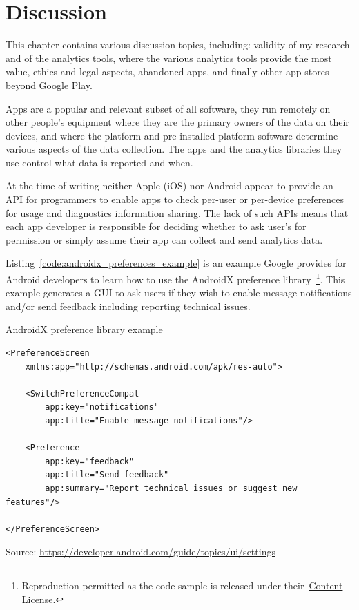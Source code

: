 \chapter{Discussion}
\label{chapter-discussion}

This chapter contains various discussion topics, including: validity of my research and of the analytics tools, where the various analytics tools provide the most value, ethics and legal aspects, abandoned apps, and finally other app stores beyond Google Play.


Apps are a popular and relevant subset of all software, they run remotely on other people’s equipment where they are the primary owners of the data on their devices, and where the platform and pre-installed platform software determine various aspects of the data collection. The apps and the analytics libraries they use control what data is reported and when. 

At the time of writing neither Apple (iOS) nor Android appear to provide an API for programmers to enable apps to check per-user or per-device preferences for usage and diagnostics information sharing. The lack of such APIs means that each app developer is responsible for deciding whether to ask user's for permission or simply assume their app can collect and send analytics data. 

Listing~\ref{code:androidx_preferences_example} is an example Google provides for Android developers to learn how to use the AndroidX preference library~\footnote{Reproduction permitted as the code sample is released under their~\href{https://developer.android.com/license}{Content License}.}. This example generates a GUI to ask users if they wish to enable message notifications and/or send feedback including reporting technical issues. 

\begin{listing}[H]
\caption{AndroidX preference library example} \label{code:androidx_preferences_example}
\begin{verbatim}
<PreferenceScreen
    xmlns:app="http://schemas.android.com/apk/res-auto">

    <SwitchPreferenceCompat
        app:key="notifications"
        app:title="Enable message notifications"/>

    <Preference
        app:key="feedback"
        app:title="Send feedback"
        app:summary="Report technical issues or suggest new features"/>

</PreferenceScreen>
\end{verbatim}
Source: \url{https://developer.android.com/guide/topics/ui/settings}
\end{listing}


